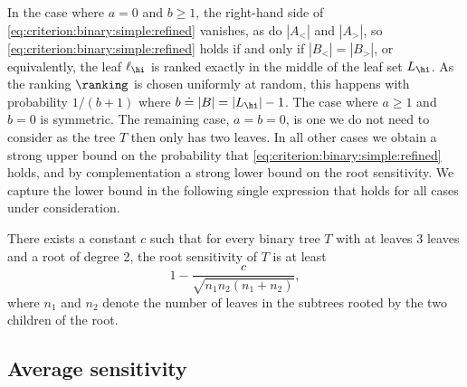 \documentclass{toc}
\begin{document}
In the case where $a = 0$ and $b \ge 1$, the right-hand side of
\eqref{eq:criterion:binary:simple:refined} vanishes, as do $|A_<|$ and $|A_>|$, so \eqref{eq:criterion:binary:simple:refined} holds if and only if $|B_<| = |B_>|$, or equivalently, the leaf $\ell_\hi$ is ranked exactly in the middle of the leaf set $L_\hi$. As the ranking $\ranking$ is chosen uniformly at random, this happens with probability $1/(b+1)$ where $b \doteq |B| = |L_\hi|-1$. The case where $a \ge 1$ and $b=0$ is symmetric. The remaining case, $a=b=0$, is one we do not need to consider as the tree $T$ then only has two leaves. In all other cases we obtain a strong upper bound on the probability that \eqref{eq:criterion:binary:simple:refined} holds, and by complementation a strong lower bound on the root sensitivity. We capture the lower bound in the following single expression that holds for all cases under consideration.
\begin{lemma}\label{lemma:sensitivity:root}
There exists a constant $c$ such that for every binary tree $T$ with at leaves 3 leaves and a root of degree 2, the root sensitivity of $T$ is at least 
\begin{equation}\label{eq:root:bound}
1 - \frac{c}{\sqrt{n_1 n_2 (n_1+n_2)}},
\end{equation}
where $n_1$ and $n_2$ denote the number of leaves in the subtrees rooted by the two children of the root.
\end{lemma}

\subsection{Average sensitivity}
\label{sec:sensitivity:average}
\end{document}
